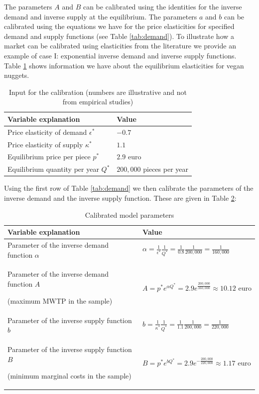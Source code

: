 \documentclass[
]{book}
\begin{document}
The parameters \(A\) and \(B\) can be calibrated using the identities for the inverse demand and inverse supply at the equilibrium. The parameters \(a\) and \(b\) can be calibrated using the equations we have for the price elasticities for specified demand and supply functions (see Table \ref{tab:demand}).
To illustrate how a market can be calibrated using elasticities from the literature we provide an example of case I: exponential inverse demand and inverse supply functions. Table \ref{tab:calibration} shows information we have about the equilibrium elasticities for vegan nuggets.

\begin{table}

\caption{\label{tab:calibration}Input for the calibration (numbers are illustrative and not from empirical studies)}
\centering
\begin{tabular}[t]{ll}
\toprule
Variable explanation & Value\\
\midrule
Price elasticity of demand $\epsilon^\ast$ & $-0.7$\\
Price elasticity of supply $\kappa^\ast$ & $1.1$\\
Equilibrium price per piece $p^\ast$ & $2.9$ euro\\
Equilibrium quantity per year $Q^\ast$ & $200,000$ pieces per year\\
\bottomrule
\end{tabular}
\end{table}

Using the first row of Table \ref{tab:demand} we then calibrate the parameters of the inverse demand and the inverse supply function. These are given in Table \ref{tab:modelparameters}:

\begin{table}

\caption{\label{tab:modelparameters}Calibrated model parameters}
\centering
\begin{tabular}[t]{ll}
\toprule
Variable explanation & Value\\
\midrule
Parameter of the inverse demand function $\alpha$ & $\alpha = \frac{1}{\epsilon^\ast}\frac{1}{Q^\ast} = \frac{1}{0.8}\frac{1}{200,000} = \frac{1}{160,000}$\\
Parameter of the inverse demand function $A$

(maximum MWTP in the sample) & $A = p^\ast e^{\alpha Q^\ast} = 2.9 e^{\frac{200,000}{160,000}} \approx 10.12 \text{ euro}$\\
Parameter of the inverse supply function $b$ & $b = \frac{1}{\kappa^\ast}\frac{1}{Q^{\ast}} = \frac{1}{1.1}\frac{1}{200,000} = \frac{1}{220,000}$\\
Parameter of the inverse supply function $B$

(minimum marginal costs in the sample) & $B = p^\ast e^{b Q^\ast} = 2.9 e^{-\frac{200,000}{220,000}} \approx 1.17 \text{ euro}$\\
\bottomrule
\end{tabular}
\end{table}
\end{document}
